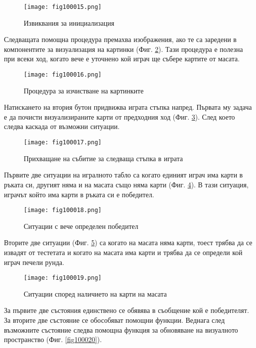\begin{figure}[H]
  \centering
  \texttt{[image: fig100015.png]}
  \caption{Извиквания за инициализация}
\label{fig100015}
\end{figure}

Следващата помощна процедура премахва изображения, ако те са заредени в компонентите за визуализация на картинки (Фиг. \ref{fig100016}). Тази процедура е полезна при всеки ход, когато вече е уточнено кой играч ще събере картите от масата.

\begin{figure}[H]
  \centering
  \texttt{[image: fig100016.png]}
  \caption{Процедура за изчистване на картинките}
\label{fig100016}
\end{figure}

Натискането на втория бутон придвижва играта стъпка напред. Първата му задача е да почисти визуализираните карти от предходния ход (Фиг. \ref{fig100017}). След което следва каскада от възможни ситуации.

\begin{figure}[H]
  \centering
  \texttt{[image: fig100017.png]}
  \caption{Прихващане на събитие за следваща стъпка в играта}
\label{fig100017}
\end{figure}

Първите две ситуации на игралното табло са когато единият играч има карти в ръката си, другият няма и на масата също няма карти (Фиг. \ref{fig100018}). В тази ситуация, играчът който има карти в ръката си е победител.

\begin{figure}[H]
  \centering
  \texttt{[image: fig100018.png]}
  \caption{Ситуации с вече определен победител}
\label{fig100018}
\end{figure}

Вторите две ситуации (Фиг. \ref{fig100019}) са когато на масата няма карти, тоест трябва да се извадят от тестетата и когато на масата има карти и трябва да се определи кой играч печели рунда.

\begin{figure}[H]
  \centering
  \texttt{[image: fig100019.png]}
  \caption{Ситуации според наличието на карти на масата}
\label{fig100019}
\end{figure}

За първите две състояния единствено се обявява в съобщение кой е победителят. За вторите две състояние се обособяват помощни функции. Веднага след възможните състояние следва помощна функция за обновяване на визуалното пространство (Фиг. \ref{fig100020}).

